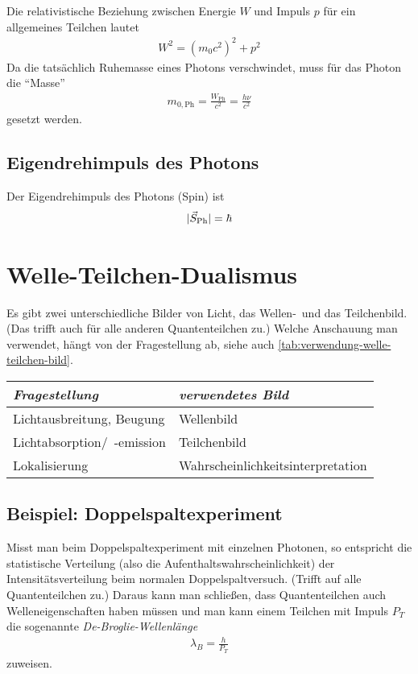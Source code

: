 Die relativistische Beziehung zwischen Energie $W$ und Impuls $p$ für ein
allgemeines Teilchen lautet
\begin{gather*}
  W^2 = (m_0c^2)^2 + p^2
\end{gather*}
Da die tatsächlich Ruhemasse eines Photons verschwindet, muss für das
Photon die \enquote{Masse}
\begin{gather*}
  m_{0,\text{Ph}}= \frac{W_\text{Ph}}{c^2} = \frac{h\nu}{c^2}
\end{gather*}
gesetzt werden.


\subsection{Eigendrehimpuls des Photons}
Der Eigendrehimpuls des Photons (Spin) ist
\begin{gather*}
  |\vec{S}_\text{Ph}| = \hbar
\end{gather*}


\section{Welle-Teilchen-Dualismus}
Es gibt zwei unterschiedliche Bilder von Licht, das Wellen-~und das
Teilchenbild. (Das trifft auch für alle anderen Quantenteilchen zu.)
Welche Anschauung man verwendet, hängt von der Fragestellung ab, siehe
auch \autoref{tab:verwendung-welle-teilchen-bild}.
\begin{table}[tbh]
  \centering
  \begin{tabular}{ll}
    \toprule
    \emph{Fragestellung} & \emph{verwendetes Bild}\\\midrule[\heavyrulewidth]
    Lichtausbreitung, Beugung & Wellenbild \\\midrule
    Lichtabsorption/~-emission & Teilchenbild \\\midrule
    Lokalisierung & Wahrscheinlichkeitsinterpretation\\\bottomrule
  \end{tabular}
\end{table}

\subsection{Beispiel: Doppelspaltexperiment}
Misst man beim Doppelspaltexperiment mit einzelnen Photonen, so
entspricht die statistische Verteilung (also die
Aufenthaltswahrscheinlichkeit) der Intensitätsverteilung beim
normalen Doppelspaltversuch. (Trifft auf alle Quantenteilchen zu.)
Daraus kann man schließen, dass Quantenteilchen auch
Welleneigenschaften haben müssen und man kann einem Teilchen mit
Impuls $P_T$ die sogenannte 
\emph{De-Broglie-Wellenlänge}
\begin{gather*}
  \lambda_B=\frac{h}{P_T}
\end{gather*}%
%
zuweisen.


